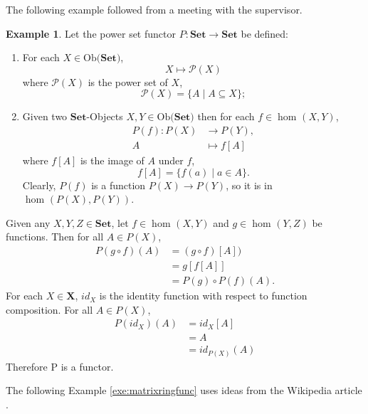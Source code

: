 \documentclass[11pt,a4paper]{article}
\theoremstyle{definition}
\newtheorem{example}[thm]{Example}
\newcommand\ho[3][]{\hom_{#1}(#2,#3)}
\newcommand\ob[1]{\mathrm{Ob(}#1\mathrm{)}}
\newcommand\objs[1]{#1-Objects}
\numberwithin{equation}{section}
\begin{document}
The following example followed from a meeting with the supervisor.
\begin{example}
\label{exe:functorpowerset}
Let the power set functor $P:\mathbf{Set}\rightarrow\mathbf{Set}$ be defined:
\begin{enumerate}
    \item For each $X\in\ob{\mathbf{Set}}$,
    \[X\mapsto\mathcal{P}(X)\]
    where $\mathcal{P}(X)$ is the power set of $X$,
    \[\mathcal{P}(X)=\{A\mid A\subseteq X\};\]
    \item Given two \objs{$\mathbf{Set}$} $X,Y\in\ob{\mathbf{Set}}$ then for each $f\in\ho{X}{Y}$,
    \begin{align*}
        P(f):P(X)&\rightarrow P(Y),\\
        A&\mapsto f[A]
    \end{align*}
    where $f[A]$ is the image of $A$ under $f$,
    \[f[A]=\{f(a)\mid a\in A\}.\]
Clearly,  $P(f)$ is a function $P(X)\to P(Y)$, so it is in $\ho{P(X)}{P(Y)}$.
\end{enumerate}
Given any $X,Y,Z\in\mathbf{Set}$, let $f\in\ho{X}{Y}$ and $g\in\ho{Y}{Z}$ be functions. Then for all $A\in P(X)$,
\begin{align*}
    P(g\circ f)(A) &= (g\circ f)[A])\\
    &=g[f[A]]\\
    &= P(g)\circ P(f)(A).
\end{align*}
For each $X\in\mathbf{X}$, $id_{X}$ is the identity function with respect to function composition. For all $A\in P(X)$,
\begin{align*}
    P(id_{X})(A) &= id_{X}[A]\\
    &= A \\
    &= id_{P(X)}(A)
\end{align*}
Therefore P is a functor.
\end{example}
The following Example \ref{exe:matrixringfunc} uses ideas from the Wikipedia article \cite{wiki:invmatrix}.
\end{document}

